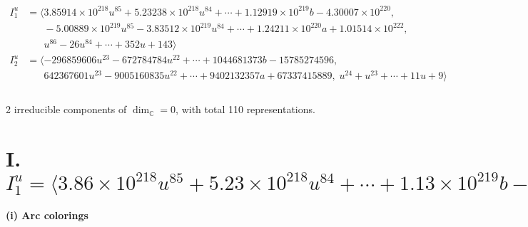 \documentclass[1p]{elsarticle_modified}
\theoremstyle{definition}
\begin{document}
\begin{align*}
I^u_{1}&=\langle 
3.85914\times10^{218} u^{85}+5.23238\times10^{218} u^{84}+\cdots+1.12919\times10^{219} b-4.30007\times10^{220},\\
\phantom{I^u_{1}}&\phantom{= \langle  }-5.00889\times10^{219} u^{85}-3.83512\times10^{219} u^{84}+\cdots+1.24211\times10^{220} a+1.01514\times10^{222},\\
\phantom{I^u_{1}}&\phantom{= \langle  }u^{86}-26 u^{84}+\cdots+352 u+143\rangle \\
I^u_{2}&=\langle 
-296859606 u^{23}-672784784 u^{22}+\cdots+1044681373 b-15785274596,\\
\phantom{I^u_{2}}&\phantom{= \langle  }642367601 u^{23}-9005160835 u^{22}+\cdots+9402132357 a+67337415889,\;u^{24}+u^{23}+\cdots+11 u+9\rangle \\
\\
\end{align*}
\raggedright * 2 irreducible components of $\dim_{\mathbb{C}}=0$, with total 110 representations.\\
\newpage
\renewcommand{\arraystretch}{1}
\centering \section*{I. $I^u_{1}= \langle 3.86\times10^{218} u^{85}+5.23\times10^{218} u^{84}+\cdots+1.13\times10^{219} b-4.30\times10^{220},\;-5.01\times10^{219} u^{85}-3.84\times10^{219} u^{84}+\cdots+1.24\times10^{220} a+1.02\times10^{222},\;u^{86}-26 u^{84}+\cdots+352 u+143 \rangle$}
\flushleft \textbf{(i) Arc colorings}\\
\end{document}
